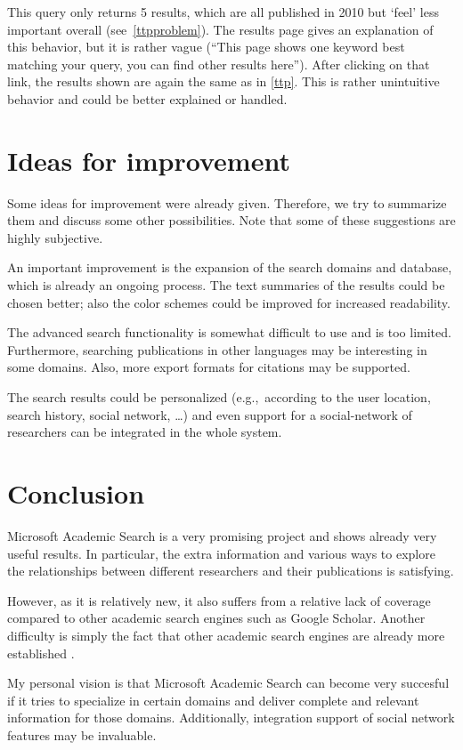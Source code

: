 \documentclass[a4paper,english,10pt]{scrartcl}
\begin{document}
This query only returns 5 results, which are all published in 2010 but `feel' less important overall (see~\autoref{ttpproblem}). The results page gives an explanation of this behavior, but it is rather vague (``This page shows one keyword best matching your query, you can find other results here''). After clicking on that link, the results shown are again the same as in \autoref{ttp}. This is rather unintuitive behavior and could be better explained or handled.


\section{Ideas for improvement}
Some ideas for improvement were already given. Therefore, we try to summarize them and discuss some other possibilities. Note that some of these suggestions are highly subjective.

An important improvement is the expansion of the search domains and database, which is already an ongoing process.
The text summaries of the results could be chosen better; also the color schemes could be improved for increased readability. 

The advanced search functionality is somewhat difficult to use and is too limited. Furthermore, searching publications in other languages may be interesting in some domains. Also, more export formats for citations may be supported. 

The search results could be personalized (e.g.,~according to the user location, search history, social network, \ldots{}) and even support for a social-network of researchers can be integrated in the whole system. 

\section{Conclusion}
Microsoft Academic Search is a very promising project and shows already very useful results. In particular, the extra information and various ways to explore the relationships between different researchers and their publications is satisfying.

However, as it is relatively new, it also suffers from a relative lack of coverage compared to other academic search engines such as Google Scholar. Another difficulty is simply the fact that other academic search engines are already more established \cite{pros}.

My personal vision is that Microsoft Academic Search can become very succesful if it tries to specialize in certain domains and deliver complete and relevant information for those domains. Additionally, integration support of social network features may be invaluable.
\end{document}
